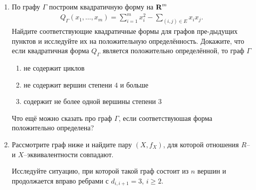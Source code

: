 \begin{enumerate}
\begin{enumerate}
\begin{center}
\end{center}
\end{enumerate}

\item По графу $\Gamma$ построим квадратичную форму на $\text{\bfseries R}^m$
\begin{align*}
Q_\Gamma(x_1, \ldots, x_m) = \sum_{i=1}^m x_i^2 - \sum_{(i,j)\in E} x_i x_j.
\end{align*}
Найдите соответствующие квадратичные формы для графов пре-\linebreak дыдущих пунктов и исследуйте их на положительную определённость. Докажите, что если квадратичная форма $Q_\Gamma$ является положительно определённой, то граф $\Gamma$
\begin{enumerate}
\item не содержит циклов
\item не содержит вершин степени $4$ и больше
\item содержит не более одной вершины степени $3$
\end{enumerate}
Что ещё можно сказать про граф $\Gamma$, если соответствуюшая форма положительно определена?
\item Рассмотрите граф ниже и найдите пару $(X,f_X)$, для которой отношения $R$-- и $X$--эквивалентности совпадают.
\begin{center}
\end{center}
Исследуйте ситуацию, при которой такой граф состоит из $n$ вершин и продолжается вправо ребрами с $d_{i,i+1} = 3$, $i \geq 2$.
\end{enumerate}